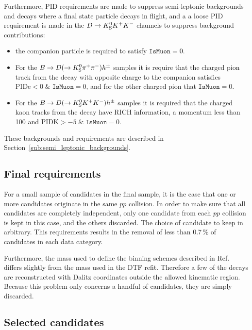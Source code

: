 Furthermore, PID requirements are made to suppress semi-leptonic backgrounds and decays where a final state particle decays in flight, and a a loose PID requirement is made in the ${D}\rightarrow{\ensuremath{{K}^0_{\mathrm{S}}}}{\ensuremath{{K}^+}}{\ensuremath{{K}^-}}$ channels to suppress background contributions:
\begin{itemize}
    \item the companion particle is required to satisfy $\texttt{IsMuon}=0$.
    \item For the ${B}\rightarrow{\ensuremath{D}}(\rightarrow{\ensuremath{{K}^0_{\mathrm{S}}}}{\ensuremath{{\pi}^+}}{\ensuremath{{\pi}^-}})h^{\pm}$ samples it is require that the charged pion track from the \D decay with opposite charge to the companion satisfies ${\textrm{PIDe} < 0 \;\&\; \texttt{IsMuon}=0}$, and for the other charged pion that ${\texttt{IsMuon}=0}$.
    \item For the ${B}\rightarrow{\ensuremath{D}}(\rightarrow{\ensuremath{{K}^0_{\mathrm{S}}}}{\ensuremath{{K}^+}}{\ensuremath{{K}^-}})h^{\pm}$ samples it is required that the charged kaon tracks from the \D decay have RICH information, a momentum less than 100 \gevc and ${\textrm{PIDK} > -5 \;\&\; \texttt{IsMuon}=0}$.
\end{itemize}
These backgrounds and requirements are described in Section~\ref{sub:semi_leptonic_backgrounds}.



\subsection{Final requirements} %
\label{sub:final_requirements}

For a small sample of candidates in the final sample, it is the case that one or more candidates originate in the same $pp$ collision. In order to make sure that all candidates are completely independent, only one candidate from each $pp$ collision is kept in this case, and the others discarded. The choice of candidate to keep in arbitrary. This requirements results in the removal of less than 0.7\,\% of candidates in each data category.

Furthermore, the \D mass used to define the binning schemes described in Ref.~\cite{CLEOCISI} differs slightly from the mass used in the DTF refit. Therefore a few of the decays are reconstructed with Dalitz coordinates outside the allowed kinematic region. Because this problem only concerns a handful of candidates, they are simply discarded.


\subsection{Selected candidates} %
\label{sub:selected_candidates}

